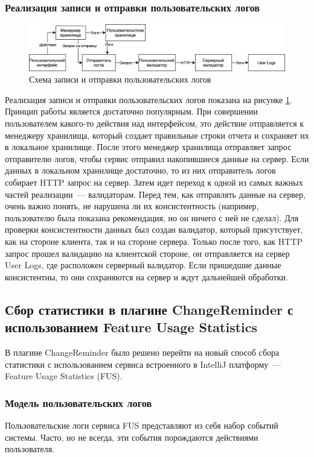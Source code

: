 \subsubsection{Реализация записи и отправки пользовательских логов}
\begin{figure}[!h]
\caption{Схема записи и отправки пользовательских логов}\label{jet-stat-logs}
\centering
\includegraphics[scale=0.15]{images/User Logs.png}
\end{figure}
Реализация записи и отправки пользовательских логов показана на рисунке \ref{jet-stat-logs}. Принцип работы является достаточно популярным. При совершении пользователем какого-то действия над интерфейсом, это действие отправляется к менеджеру хранилища, который создает правильные строки отчета и сохраняет их в локальное хранилище. После этого менеджер хранилища отправляет запрос отправителю логов, чтобы сервис отправил накопившиеся данные на сервер. Если данных в локальном хранилище достаточно, то из них отправитель логов собирает HTTP запрос на сервер. Затем идет переход к одной из самых важных частей реализации~--- валидаторам. Перед тем, как отправлять данные на сервер, очень важно понять, не нарушена ли их консистентность (например, пользователю была показана рекомендация, но он ничего с ней не сделал). Для проверки консистентности данных был создан валидатор, который присутствует, как на стороне клиента, так и на стороне сервера. Только после того, как HTTP запрос прошел валидацию на клиентской стороне, он отправляется на сервер User Logs, где расположен серверный валидатор. Если пришедшие данные консистентны, то они сохраняются на сервер и ждут дальнейшей обработки.

\subsection{Сбор статистики в плагине ChangeReminder с использованием Feature Usage Statistics}\label{changereminder-stats}
В плагине ChangeReminder было решено перейти на новый способ сбора статистики с использованием сервиса встроенного в IntelliJ платформу~--- Feature Usage Statistics (FUS).
\subsubsection{Модель пользовательских логов}
Пользовательские логи сервиса FUS представляют из себя набор событий системы. Часто, но не всегда, эти события порождаются действиями пользователя.
